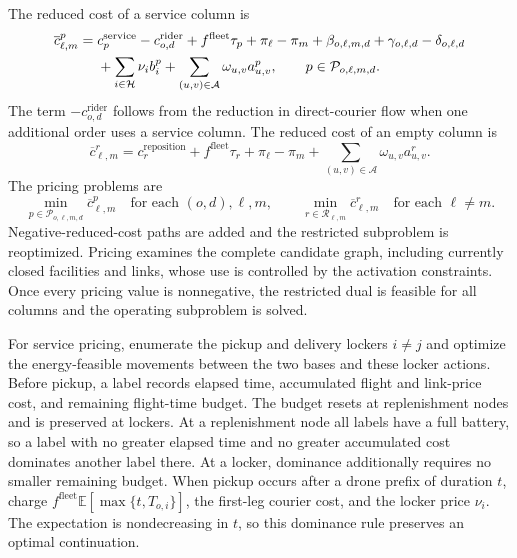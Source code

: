 \documentclass[final,3p,authoryear]{elsarticle}
\begin{document}
The reduced cost of a service column is
\begin{align}
 \overline c_{\ell,m}^{p}
 ={}&c_p^{\mathrm{service}}-c_{o,d}^{\mathrm{rider}}
 +f^{\mathrm{fleet}}\tau_p+\pi_\ell-\pi_m
 +\beta_{o,\ell,m,d}+\gamma_{o,\ell,d}-\delta_{o,\ell,d}\notag\\
 &+\sum_{i\in\mathcal H}\nu_i b_i^p
 +\sum_{(u,v)\in\mathcal A}\omega_{u,v}a_{u,v}^p,
 \qquad p\in\mathcal P_{o,\ell,m,d}.
 \label{eq:path_rc_service}
\end{align}
The term $-c_{o,d}^{\mathrm{rider}}$ follows from the reduction in direct-courier flow when one additional order uses a service column.
The reduced cost of an empty column is
\begin{equation}
 \overline c_{\ell,m}^{r}
 =c_r^{\mathrm{reposition}}+f^{\mathrm{fleet}}\tau_r
 +\pi_\ell-\pi_m
 +\sum_{(u,v)\in\mathcal A}\omega_{u,v}a_{u,v}^{r}.
 \label{eq:path_rc_empty}
\end{equation}
The pricing problems are
\begin{equation}
 \min_{p\in\mathcal P_{o,\ell,m,d}}\overline c_{\ell,m}^{p}
 \quad\text{for each }(o,d),\ell,m,
 \qquad
 \min_{r\in\mathcal R_{\ell,m}}\overline c_{\ell,m}^{r}
 \quad\text{for each }\ell\ne m.
 \label{eq:path_pricing}
\end{equation}
Negative-reduced-cost paths are added and the restricted subproblem is reoptimized.
Pricing examines the complete candidate graph, including currently closed facilities and links, whose use is controlled by the activation constraints.
Once every pricing value is nonnegative, the restricted dual is feasible for all columns and the operating subproblem is solved.

For service pricing, enumerate the pickup and delivery lockers $i\ne j$ and optimize the energy-feasible movements between the two bases and these locker actions.
Before pickup, a label records elapsed time, accumulated flight and link-price cost, and remaining flight-time budget.
The budget resets at replenishment nodes and is preserved at lockers.
At a replenishment node all labels have a full battery, so a label with no greater elapsed time and no greater accumulated cost dominates another label there.
At a locker, dominance additionally requires no smaller remaining budget.
When pickup occurs after a drone prefix of duration $t$, charge $f^{\mathrm{fleet}}\mathbb E[\max\{t,T_{o,i}\}]$, the first-leg courier cost, and the locker price $\nu_i$.
The expectation is nondecreasing in $t$, so this dominance rule preserves an optimal continuation.
\end{document}
